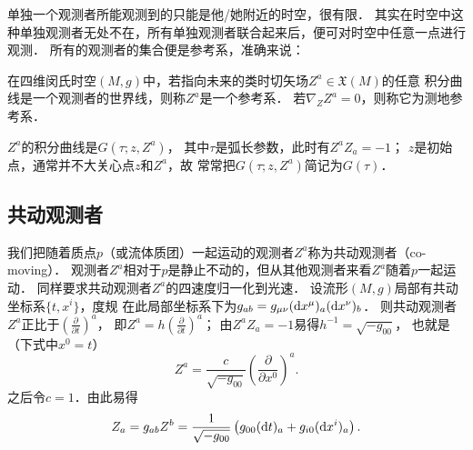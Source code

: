 

单独一个观测者所能观测到的只能是他/她附近的时空，很有限．
其实在时空中这种单独观测者无处不在，所有单独观测者联合起来后，便可对时空中任意一点进行观测．
所有的观测者的集合便是参考系，准确来说：

\begin{definition}\label{chfd:def_reference-frame}
    在四维闵氏时空$(M,g)$中，若指向未来的类时切矢场$Z^a\in \mathfrak{X}(M)$的任意
    积分曲线是一个观测者的世界线，则称$Z^a$是一个{\heiti 参考系}．
    若$\nabla_Z Z^a=0$，则称它为{\heiti 测地参考系}．
\end{definition}

$Z^a$的积分曲线是$G(\tau ;z,Z^a)$，
其中$\tau$是弧长参数，此时有$Z^a Z_a=-1$；
$z$是初始点，通常并不大关心点$z$和$Z^a$，故
常常把$G(\tau ;z,Z^a)$简记为$G(\tau)$．



\subsection{共动观测者}\label{chfd:sec_comoving}
我们把随着质点$p$（或流体质团）一起运动的观测者$Z^a$称为{\heiti 共动观测者}（co-moving）．
观测者$Z^a$相对于$p$是静止不动的，但从其他观测者来看$Z^a$随着$p$一起运动．
同样要求共动观测者$Z^a$的四速度归一化到光速．
设流形$(M,g)$局部有共动坐标系$\{t,x^i\}$，度规
在此局部坐标系下为$g_{ab}=g_{\mu\nu}({\rm d}x^\mu)_a ({\rm d}x^\nu)_b$．
则共动观测者$Z^a$正比于$(\frac{\partial}{\partial t})^a$，
即$Z^a= h (\frac{\partial}{\partial t})^a$；
由$Z^a Z_a=-1$易得$h^{-1}=\sqrt{-g_{00}}$，
也就是（下式中$x^0=t$）
\begin{equation}
    Z^a= \frac{c}{\sqrt{-g_{00}}} \left(\frac{\partial}{\partial x^0}\right)^a .
\end{equation}
之后令$c=1$．由此易得
\begin{equation}
    Z_a= g_{ab}Z^b =\frac{1}{\sqrt{-g_{00}}}\left(
    g_{00}({\rm d}t)_a + g_{i0} ({\rm d}x^i)_a\right) .
\end{equation}


